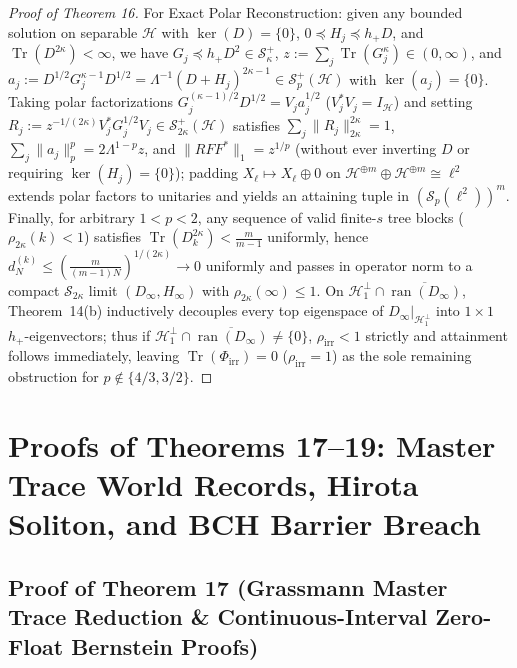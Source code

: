\documentclass[10pt,letterpaper]{article}
\newcommand{\Hilb}{\mathcal{H}}
\newcommand{\Sp}{\mathcal{S}_p}
\newcommand{\Tr}{\operatorname{Tr}}
\newcommand{\ran}{\operatorname{ran}}
\begin{document}
\begin{proof}[Proof of Theorem 16]
For Exact Polar Reconstruction: given any bounded solution on separable $\Hilb$ with $\ker(D) = \{0\}$, $0 \preceq H_j \preceq h_+ D$, and $\Tr(D^{2\kappa}) < \infty$, we have $G_j \preceq h_+ D^2 \in \mathcal{S}_\kappa^+$, $z := \sum_j \Tr(G_j^\kappa) \in (0, \infty)$, and $a_j := D^{1/2} G_j^{\kappa-1} D^{1/2} = \Lambda^{-1}(D+H_j)^{2\kappa-1} \in \Sp^+(\Hilb)$ with $\ker(a_j) = \{0\}$. Taking polar factorizations $G_j^{(\kappa-1)/2} D^{1/2} = V_j a_j^{1/2}$ ($V_j^* V_j = I_{\Hilb}$) and setting $R_j := z^{-1/(2\kappa)} V_j^* G_j^{1/2} V_j \in \mathcal{S}_{2\kappa}^+(\Hilb)$ satisfies $\sum_j \|R_j\|_{2\kappa}^{2\kappa} = 1$, $\sum_j \|a_j\|_p^p = 2\Lambda^{1-p} z$, and $\|R F F^*\|_1 = z^{1/p}$ (without ever inverting $D$ or requiring $\ker(H_j) = \{0\}$); padding $X_\ell \mapsto X_\ell \oplus 0$ on $\Hilb^{\oplus m} \oplus \Hilb^{\oplus m} \cong \ell^2$ extends polar factors to unitaries and yields an attaining tuple in $(\Sp(\ell^2))^m$. Finally, for arbitrary $1 < p < 2$, any sequence of valid finite-$s$ tree blocks ($\rho_{2\kappa}(k) < 1$) satisfies $\Tr(D_k^{2\kappa}) < \frac{m}{m-1}$ uniformly, hence $d_N^{(k)} \le (\frac{m}{(m-1)N})^{1/(2\kappa)} \to 0$ uniformly and passes in operator norm to a compact $\mathcal{S}_{2\kappa}$ limit $(D_\infty, H_\infty)$ with $\rho_{2\kappa}(\infty) \le 1$. On $\Hilb_1^\perp \cap \overline{\ran(D_\infty)}$, Theorem~14(b) inductively decouples every top eigenspace of $D_\infty|_{\Hilb_1^\perp}$ into $1\times 1$ $h_+$-eigenvectors; thus if $\Hilb_1^\perp \cap \overline{\ran(D_\infty)} \neq \{0\}$, $\rho_{\mathrm{irr}} < 1$ strictly and attainment follows immediately, leaving $\Tr(\Phi_{\mathrm{irr}}) = 0$ ($\rho_{\mathrm{irr}} = 1$) as the sole remaining obstruction for $p \notin \{4/3, 3/2\}$.
\end{proof}

\section{Proofs of Theorems 17--19: Master Trace World Records, Hirota Soliton, and BCH Barrier Breach}

\subsection{Proof of Theorem 17 (Grassmann Master Trace Reduction \& Continuous-Interval Zero-Float Bernstein Proofs)}
\end{document}
